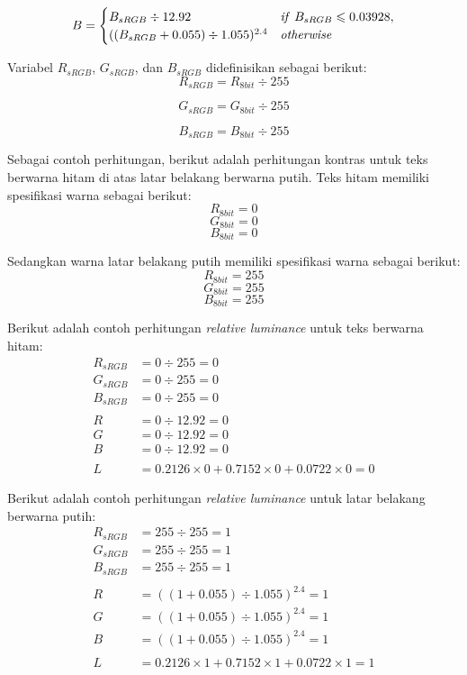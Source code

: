 \begin{equation}
B = \begin{cases}
B_{sRGB}\div 12.92 & \text{\textit{if} $B_{sRGB} \leqslant 0.03928$}, \\
((B_{sRGB} + 0.055)\div 1.055)^{2.4} & \text{\textit{otherwise}}
\end{cases}
\end{equation}

Variabel $R_{sRGB}$, $G_{sRGB}$, dan $B_{sRGB}$ didefinisikan sebagai berikut:
\begin{equation}
R_{sRGB} = R_{8bit} \div 255
\end{equation}

\begin{equation}
G_{sRGB} = G_{8bit} \div 255
\end{equation}

\begin{equation}
B_{sRGB} = B_{8bit} \div 255
\end{equation}

Sebagai contoh perhitungan, berikut adalah perhitungan kontras untuk teks berwarna hitam di atas latar belakang berwarna putih. Teks hitam memiliki spesifikasi warna sebagai berikut:
\[
R_{8bit} = 0
\]
\[
G_{8bit} = 0
\]
\[
B_{8bit} = 0
\]

Sedangkan warna latar belakang putih memiliki spesifikasi warna sebagai berikut:
\[
R_{8bit} = 255
\]
\[
G_{8bit} = 255
\]
\[
B_{8bit} = 255
\]

Berikut adalah contoh perhitungan \textit{relative luminance} untuk teks berwarna hitam:
\begin{align*}
R_{sRGB} &= 0 \div 255 = 0 \\
G_{sRGB} &= 0 \div 255 = 0 \\
B_{sRGB} &= 0 \div 255 = 0 \\
\\
R &= 0 \div 12.92 = 0 \\
G &= 0 \div 12.92 = 0 \\
B &= 0 \div 12.92 = 0 \\
\\
L &= 0.2126 \times 0 + 0.7152 \times 0 + 0.0722 \times 0 = 0
\end{align*}

Berikut adalah contoh perhitungan \textit{relative luminance} untuk latar belakang berwarna putih:
\begin{align*}
R_{sRGB} &= 255 \div 255 = 1 \\
G_{sRGB} &= 255 \div 255 = 1 \\
B_{sRGB} &= 255 \div 255 = 1 \\
\\
R &= ((1 + 0.055)\div 1.055)^{2.4} = 1 \\
G &= ((1 + 0.055)\div 1.055)^{2.4} = 1 \\
B &= ((1 + 0.055)\div 1.055)^{2.4} = 1 \\
\\
L &= 0.2126 \times 1 + 0.7152 \times 1 + 0.0722 \times 1 = 1
\end{align*}

